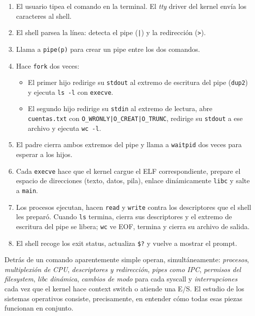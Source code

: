 \documentclass[11pt,a4paper]{article}
\begin{document}
\begin{enumerate}[leftmargin=*]
    \item El usuario tipea el comando en la terminal. El \emph{tty}
        driver del kernel envía los caracteres al shell.
    \item El shell parsea la línea: detecta el pipe (\texttt{|}) y la
        redirección (\texttt{>}).
    \item Llama a \texttt{pipe(p)} para crear un pipe entre los dos
        comandos.
    \item Hace \texttt{fork} dos veces:
        \begin{itemize}
            \item El primer hijo redirige su \texttt{stdout} al
                extremo de escritura del pipe (\texttt{dup2}) y ejecuta
                \texttt{ls -l} con \texttt{execve}.
            \item El segundo hijo redirige su \texttt{stdin} al
                extremo de lectura, abre \texttt{cuentas.txt} con
                \texttt{O\_WRONLY|O\_CREAT|O\_TRUNC}, redirige su
                \texttt{stdout} a ese archivo y ejecuta \texttt{wc -l}.
        \end{itemize}
    \item El padre cierra ambos extremos del pipe y llama a
        \texttt{waitpid} dos veces para esperar a los hijos.
    \item Cada \texttt{execve} hace que el kernel cargue el ELF
        correspondiente, prepare el espacio de direcciones (texto,
        datos, pila), enlace dinámicamente \texttt{libc} y salte a
        \texttt{main}.
    \item Los procesos ejecutan, hacen \texttt{read} y \texttt{write}
        contra los descriptores que el shell les preparó. Cuando
        \texttt{ls} termina, cierra sus descriptores y el extremo de
        escritura del pipe se libera; \texttt{wc} ve EOF, termina y
        cierra su archivo de salida.
    \item El shell recoge los exit status, actualiza \texttt{\$?} y
        vuelve a mostrar el prompt.
\end{enumerate}

Detrás de un comando aparentemente simple operan, simultáneamente:
\emph{procesos}, \emph{multiplexión de CPU}, \emph{descriptores y
redirección}, \emph{pipes como IPC}, \emph{permisos del filesystem},
\emph{libc dinámica}, \emph{cambios de modo} para cada syscall y
\emph{interrupciones} cada vez que el kernel hace context switch o
atiende una E/S. El estudio de los sistemas operativos consiste,
precisamente, en entender cómo todas esas piezas funcionan en conjunto.
\end{document}
